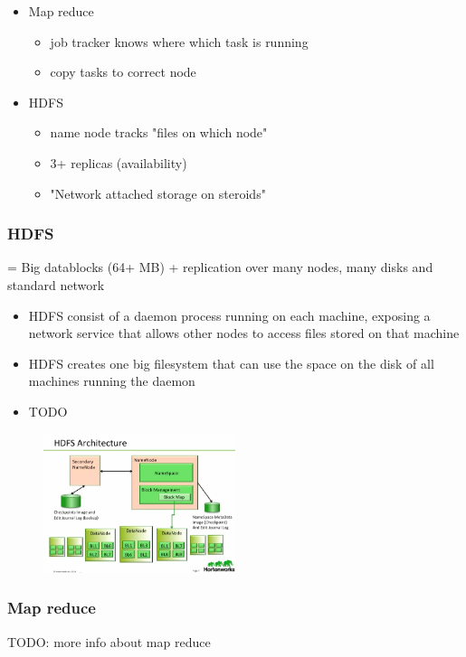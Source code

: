 \documentclass{article}
\begin{document}
\begin{itemize}
    \item Map reduce
    \begin{itemize}
        \item job tracker knows where which task is running
        \item copy tasks to correct node
    \end{itemize}
    \item HDFS
    \begin{itemize}
        \item name node tracks "files on which node"
        \item 3+ replicas (availability)
        \item "Network attached storage on steroids"
    \end{itemize}
\end{itemize}

\subsubsection{HDFS}

= Big datablocks (64+ MB) + replication over many nodes, many disks and standard network

\begin{itemize}
    \item HDFS consist of a daemon process running on each machine, exposing a network service that allows other nodes to access files stored on that machine
    \item HDFS creates one big filesystem that can use the space on the disk of all machines running the daemon
    \item TODO
\end{itemize}

\begin{figure}[H]
    \centering
    \includegraphics[width=0.5\textwidth]{hdfs.png}
    \caption{}
\end{figure}

\subsubsection{Map reduce}
TODO: more info about map reduce
\end{document}
